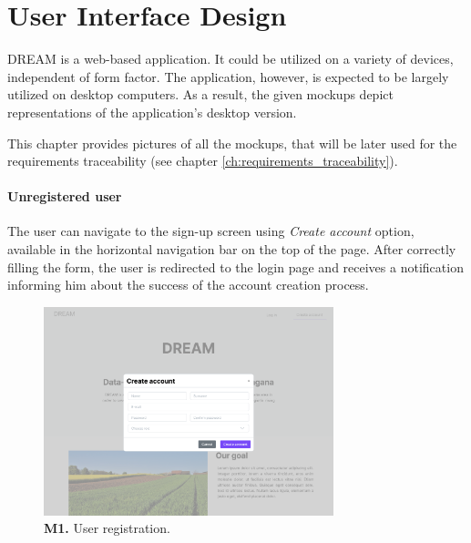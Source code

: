     \chapter{User Interface Design}\label{chap:ui}
    
    DREAM is a web-based application. It could be utilized on a variety of devices, independent of form factor. The application, however, is expected to be largely utilized on desktop computers. As a result, the given mockups depict representations of the application's desktop version.
    
    This chapter provides pictures of all the  mockups, that will be later used for the requirements traceability (see chapter \ref{ch:requirements_traceability}).
    
    \subsubsection{Unregistered user}
    
    The user can navigate to the sign-up screen using \textit{Create account} option, available in the horizontal navigation bar on the top of the page. After correctly filling the form, the user is redirected to the login page and receives a notification informing him about the success of the account creation process.
    \begin{figure}[H]
        \centering
        \includegraphics[width=0.75\textwidth]{mockups/Unreg. user_Create account.png}
        \caption{\textbf{M1.} User registration.}
        \label{fig:user-create-account}
    \end{figure}
    
